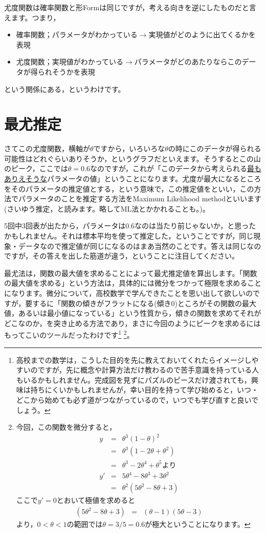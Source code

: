 \documentclass{ltjsarticle}
\begin{document}
尤度関数は確率関数と形Formは同じですが，考える向きを逆にしたものだと言えます。つまり，
\begin{itemize}
    \item 確率関数；パラメータがわかっている$\to$実現値がどのように出てくるかを表現
    \item 尤度関数；実現値がわかっている$\to$パラメータがどのあたりならこのデータが得られそうかを表現
\end{itemize}
という関係にある，というわけです。

\section{最尤推定}
さてこの尤度関数，横軸が$\theta$ですから，いろいろな$\theta$の時にこのデータが得られる可能性はどれぐらいありそうか，というグラフだといえます。そうするとこの山のピーク，ここでは$\theta=0.6$なのですが，これが「このデータから考えられる\underline{最もありえそうな}パラメータの値」ということになります。尤度が最大になるところをそのパラメータの推定値とする，という意味で，この推定値をといい，この方法でパラメータのことを推定する方法をMaximum Likelihood methodといいます(さいゆう推定，と読みます。略してML法とかかれることも。)。

5回中3回表が出たから，パラメータは$0.6$なのは当たり前じゃないか，と思ったかもしれません。それは標本平均を使って推定した，ということですが，同じ現象・データなので推定値が同じになるのはまあ当然のことです。答えは同じなのですが，その答えを出した筋道が違う，ということに注目してください。

最尤法は，関数の最大値を求めることによって最尤推定値を算出します。「関数の最大値を求める」という方法は，具体的には微分をつかって極限を求めることになります。微分について，高校数学で学んできたことを思い出して欲しいのですが，要するに「関数の傾きがフラットになる(傾き$0$)ところがその関数の最大値，あるいは最小値になっている」という性質から，傾きの関数を求めてそれがどこなのか，を突き止める方法であり，まさに今回のようにピークを求めるにはもってこいのツールだったわけです\footnote{高校までの数学は，こうした目的を先に教えておいてくれたらイメージしやすいのですが，先に概念や計算方法だけ教わるので苦手意識を持っている人もいるかもしれません。完成図を見ずにパズルのピースだけ渡されても，興味は持ちにくいかもしれませんが，幸い目的を持って学び始めると，いつ・どこから始めても必ず道がつながっているので，いつでも学び直すと良いでしょう。}
\footnote{今回，この関数を微分すると，
\begin{eqnarray*}
    y &=& \theta^3(1-\theta)^2 \\
    & =& \theta^3(1-2\theta+\theta^2)\\
    &=& \theta^3 - 2\theta^4 + \theta^5 \mbox{より}\\
    y' &=& 5\theta^4 - 8\theta^3 + 3\theta^2\\
    &=& \theta^2(5\theta^2-8\theta+3)
\end{eqnarray*}
ここで$y'=0$とおいて極値を求めると
\begin{eqnarray*}
    (5\theta^2-8\theta+3) &=& (\theta -1)(5\theta -3)
\end{eqnarray*}
より，$0< \theta < 1$の範囲では$\theta=3/5=0.6$が極大ということになります。
}。
\end{document}
